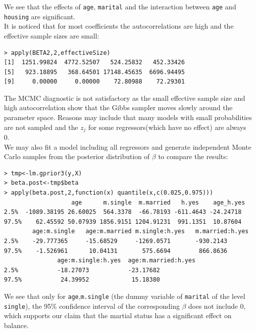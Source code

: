 \documentclass[a4page]{article}
\begin{document}
    We see that the effects of \verb|age|, \verb|marital| and the interaction between \verb|age| and \verb|housing| are significant.\\
    It is noticed that for most coefficients the autocorrelations are high and the effective sample sizes are small:
    \begin{verbatim}
> apply(BETA2,2,effectiveSize)
[1]  1251.99824  4772.52507   524.25832   452.33426
[5]   923.18895   368.64501 17148.45635  6696.94495
[9]     0.00000     0.00000    72.80988    72.29301
    \end{verbatim}
    The MCMC diagnostic is not satisfactory as the small effective sample size and high autocorrelation show that the Gibbs sampler moves slowly around the parameter space. Reasons may include that many models with small probabilities are not sampled and the $z_j$ for some regressors(which have no effect) are always 0.\\
    We may also fit a model including all regressors and generate independent Monte Carlo samples from the posterior distribution of $\beta$ to compare the results:
\begin{verbatim}
> tmp<-lm.gprior3(y,X)
> beta.post<-tmp$beta
> apply(beta.post,2,function(x) quantile(x,c(0.025,0.975)))
                   age      m.single  m.married   h.yes    age_h.yes
2.5%  -1089.38195 26.60025  564.3378  -66.78193 -611.4643 -24.24718
97.5%    62.45592 50.07939 1856.9151 1204.91231  991.1351  10.87604
        age:m.single   age:m.married m.single:h.yes   m.married:h.yes
2.5%    -29.777365     -15.68529     -1269.0571       -930.2143
97.5%    -1.526961      10.04131       575.6694        866.8636
               age:m.single:h.yes  age:m.married:h.yes
2.5%           -18.27073           -23.17682
97.5%           24.39952            15.18380
\end{verbatim}
    We see that only for \verb|age|,\verb|m.single| (the dummy variable of \verb|marital| of the level \verb|single|), the 95\% confidence interval of the corresponding $\beta$ does not include 0, which supports our claim that the martial status has a significant effect on balance.
\end{document}
